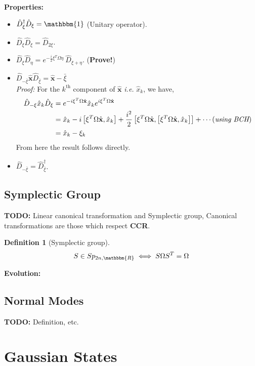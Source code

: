 \documentclass[english,10pt,a4paper]{article}
\newtheorem{definition}{Definition}
\newcommand{\xx}{\hat{\textbf{x}}}
\newcommand{\dd}[1]{\hat{D}_{#1}}
\begin{document}
	\textbf{Properties:}	\begin{itemize}
		\item $\dd{\xi}^\dagger \dd{\xi} = \mathbbm{1}$ (Unitary operator).
		\item $\dd{\xi}\dd{\xi}=\dd{2\xi}$.
		\item $\dd{\xi}\dd{\eta} = e^{-\frac{i}{2}\xi^T\Omega \eta}\ \dd{\xi+\eta}$. (\textbf{Prove!})
		\item$\dd{-\bar{\xi}} \xx \dd{\bar{\xi}} = \xx - \bar{\xi}$\\
		\textit{Proof:} For the $k^\text{th}$ component of $\xx$ \textit{i.e.} $\hat x_k$, we have, \begin{align*}
			\dd{-\xi} \hat x_k \dd{\xi} &= e^{-i\xi^T \Omega\xx}\hat x_k e^{i\xi^T \Omega\xx} \\
			&= \hat x_k -i\left[\xi^T\Omega\xx, \hat x_k \right] + \frac{i^2}{2}\left[ \xi^T\Omega\xx, \left[\xi^T\Omega\xx, \hat x_k \right]   \right] + \cdots \hfil (\textit{using BCH})\\
			&=\hat x_k -\xi_k
		\end{align*}
		From here the result follows directly.
		\item $\dd{-\bar{\xi}} = \dd{\bar{\xi}}^\dagger$.
	\end{itemize}
	
	
	
	\subsection{Symplectic Group}
	\textbf{TODO:} Linear canonical transformation and Symplectic group, Canonical transformations are those which respect  \textbf{CCR}.
	\begin{definition}
		[Symplectic group]
		\begin{equation}
			\label{eq:symplectic_group}
			S\in Sp_{2n,\mathbbm{R}} \iff S\Omega S^T=\Omega
		\end{equation}
	\end{definition}
	\textbf{Evolution:}
	
	
	\subsection{Normal Modes}
	\textbf{TODO: }Definition, etc.
	
	\section{Gaussian States}
	
\end{document}
